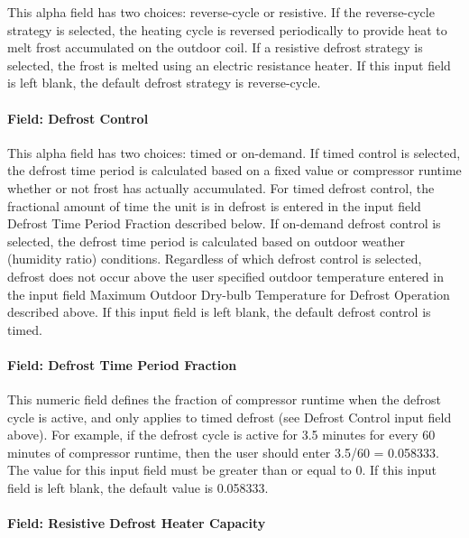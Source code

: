 This alpha field has two choices: reverse-cycle or resistive. If the reverse-cycle strategy is selected, the heating cycle is reversed periodically to provide heat to melt frost accumulated on the outdoor coil. If a resistive defrost strategy is selected, the frost is melted using an electric resistance heater. If this input field is left blank, the default defrost strategy is reverse-cycle.

\paragraph{Field: Defrost Control}\label{field-defrost-control-1}

This alpha field has two choices: timed or on-demand. If timed control is selected, the defrost time period is calculated based on a fixed value or compressor runtime whether or not frost has actually accumulated. For timed defrost control, the fractional amount of time the unit is in defrost is entered in the input field Defrost Time Period Fraction described below. If on-demand defrost control is selected, the defrost time period is calculated based on outdoor weather (humidity ratio) conditions. Regardless of which defrost control is selected, defrost does not occur above the user specified outdoor temperature entered in the input field Maximum Outdoor Dry-bulb Temperature for Defrost Operation described above. If this input field is left blank, the default defrost control is timed.

\paragraph{Field: Defrost Time Period Fraction}\label{field-defrost-time-period-fraction-1}

This numeric field defines the fraction of compressor runtime when the defrost cycle is active, and only applies to timed defrost (see Defrost Control input field above). For example, if the defrost cycle is active for 3.5 minutes for every 60 minutes of compressor runtime, then the user should enter 3.5/60 = 0.058333. The value for this input field must be greater than or equal to 0. If this input field is left blank, the default value is 0.058333.

\paragraph{Field: Resistive Defrost Heater Capacity}\label{field-resistive-defrost-heater-capacity-1}

